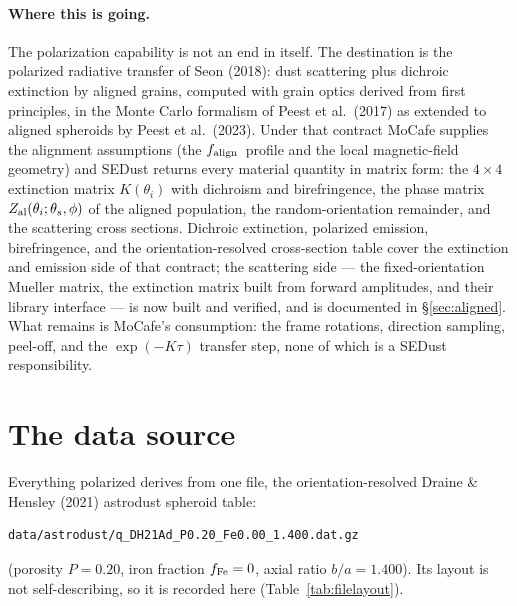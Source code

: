 \documentclass{my_memo}
\newcommand{\falign}{\ensuremath{f_{\rm align}}}
\begin{document}
\paragraph{Where this is going.} The polarization capability is not an end in
itself. The destination is the polarized radiative transfer of
Seon (2018): dust scattering plus dichroic extinction by aligned grains,
computed with grain optics derived from first principles, in the Monte Carlo
formalism of Peest et al.\ (2017) as extended to aligned spheroids by
Peest et al.\ (2023). Under that contract MoCafe supplies the alignment
assumptions (the \falign\ profile and the local magnetic-field geometry) and
SEDust returns every material quantity in matrix form: the $4\times4$
extinction matrix $K(\theta_i)$ with dichroism and birefringence, the phase
matrix $Z_{\rm al}(\theta_i;\theta_s,\phi)$ of the aligned population, the
random-orientation remainder, and the scattering cross sections. Dichroic
extinction, polarized emission, birefringence, and the orientation-resolved
cross-section table cover the extinction and emission side of that contract; the
scattering side --- the fixed-orientation Mueller matrix, the extinction matrix
built from forward amplitudes, and their library interface --- is now built and
verified, and is documented in \S\ref{sec:aligned}. What remains is MoCafe's
consumption: the frame rotations, direction sampling, peel-off, and the
$\exp(-K\tau)$ transfer step, none of which is a SEDust responsibility.

\section{The data source}\label{sec:source}

Everything polarized derives from one file, the orientation-resolved
Draine \& Hensley (2021) astrodust spheroid table:
\begin{lstlisting}[style=sh]
data/astrodust/q_DH21Ad_P0.20_Fe0.00_1.400.dat.gz
\end{lstlisting}
(porosity $P=0.20$, iron fraction $f_{\rm Fe}=0$, axial ratio $b/a=1.400$).
Its layout is not self-describing, so it is recorded here
(Table~\ref{tab:filelayout}).
\end{document}
